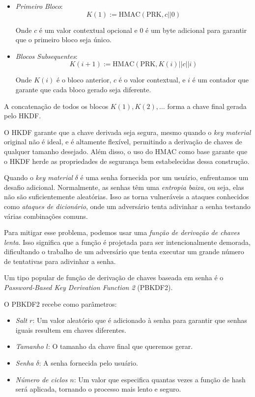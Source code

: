 \begin{itemize}
    \item {\em Primeiro Bloco}:
    \begin{displaymath}
      K(1) := \text{HMAC}(\text{PRK}, c || 0)
    \end{displaymath}

    Onde $c$ é um valor contextual opcional e 0 é um byte adicional para garantir que o primeiro bloco seja único.

    \item {\em Blocos Subsequentes}:
    \begin{displaymath}
    K(i + 1) := \text{HMAC}(\text{PRK}, K(i) || c || i)
    \end{displaymath}
    
    Onde $K(i)$ é o bloco anterior, $c$ é o valor contextual, e $i$ é um contador que garante que cada bloco gerado seja diferente.
\end{itemize}

A concatenação de todos os blocos $K(1), K(2), \dots$ forma a chave final gerada pelo HKDF.

O HKDF garante que a chave derivada seja segura, mesmo quando o \textit{key material} original não é ideal, e é altamente flexível, permitindo a derivação de chaves de qualquer tamanho desejado.
Além disso, o uso do HMAC como base garante que o HKDF herde as propriedades de segurança bem estabelecidas dessa construção.


Quando o \textit{key material} $\delta$ é uma senha fornecida por um usuário, enfrentamos um desafio adicional.
Normalmente, as senhas têm uma {\em entropia baixa}, ou seja, elas não são suficientemente aleatórias.
Isso as torna vulneráveis a ataques conhecidos como {\em ataques de dicionário}, onde um adversário tenta adivinhar a senha testando várias combinações comuns.

Para mitigar esse problema, podemos usar uma {\em função de derivação de chaves lenta}.
Isso significa que a função é projetada para ser intencionalmente demorada, dificultando o trabalho de um adversário que tenta executar um grande número de tentativas para adivinhar a senha.

Um tipo popular de função de derivação de chaves baseada em senha é o {\em Password-Based Key Derivation Function 2} (PBKDF2).

O PBKDF2 recebe como parâmetros:
\begin{itemize}
    \item[] {\em Salt $r$}: Um valor aleatório que é adicionado à senha para garantir que senhas iguais resultem em chaves diferentes.
    \item[] {\em Tamanho $l$}: O tamanho da chave final que queremos gerar.
    \item[] {\em Senha $\delta$}: A senha fornecida pelo usuário.
    \item[] {\em Número de ciclos $n$}: Um valor que especifica quantas vezes a função de hash será aplicada, tornando o processo mais lento e seguro.
\end{itemize}

